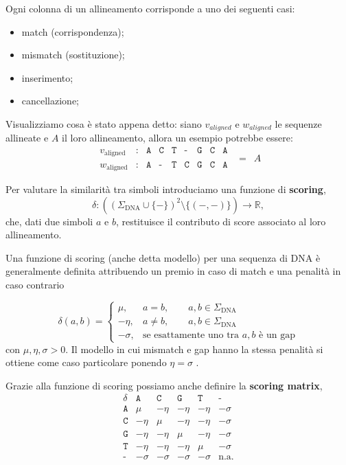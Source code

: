 Ogni colonna di un allineamento corrisponde a uno dei seguenti casi:
\begin{itemize}
    \item match (corrispondenza);
    \item mismatch (sostituzione);
    \item inserimento;
    \item cancellazione;
\end{itemize}

Visualizziamo cosa è stato appena detto: siano $v_{aligned}$ e $w_{aligned}$ le sequenze allineate e $A$ il loro allineamento,
allora un esempio potrebbe essere:
\[
    \begin{matrix}
        v_{\text{aligned}} & : & \texttt{A} & \texttt{C} & \texttt{T} & \texttt{-} & \texttt{G} & \texttt{C} & \texttt{A} \\
        w_{\text{aligned}} & : & \texttt{A} & \texttt{-} & \texttt{T} & \texttt{C} & \texttt{G} & \texttt{C} & \texttt{A} 
    \end{matrix}\enspace = \enspace A
\]

Per valutare la similarità tra simboli introduciamo una funzione di \textbf{scoring},
\[
    \delta : ((\Sigma_{\text{DNA}}\cup \{ - \})^{2}\setminus \{ (-,-) \}) \to \mathbb{R},
\]
che, dati due simboli $a$ e $b$, restituisce il contributo di score associato al loro allineamento.

Una funzione di scoring (anche detta modello) per una sequenza di DNA è generalmente definita attribuendo un premio in caso di match e una penalità in caso contrario

\[
    \delta(a,b)=
    \begin{cases}
        \mu, & a=b, \qquad a,b \in \Sigma_{\text{DNA}} \\
        -\eta, & a\neq b, \qquad a,b \in \Sigma_{\text{DNA}}\\
        -\sigma, & \text{se esattamente uno tra }a, b \text{ è un gap}
    \end{cases}
\]
con $\mu,\eta,\sigma > 0$.
Il modello in cui mismatch e gap hanno la stessa penalità si ottiene come caso particolare ponendo $\eta = \sigma$
\cite[pp.~177--180]{jones--pevzner}.

Grazie alla funzione di scoring possiamo anche definire la \textbf{scoring matrix}, 
\[
    \begin{array}{c|ccccc}
    \delta & \texttt{A} & \texttt{C} & \texttt{G} & \texttt{T} & \texttt{-}\\
    \hline
    \texttt{A} & \mu & -\eta & -\eta & -\eta & -\sigma\\
    \texttt{C} & -\eta & \mu & -\eta & -\eta & -\sigma\\
    \texttt{G} & -\eta & -\eta & \mu & -\eta & -\sigma\\
    \texttt{T} & -\eta & -\eta & -\eta & \mu & -\sigma\\
    \texttt{-} & -\sigma & -\sigma & -\sigma & -\sigma & \text{n.a.}
    \end{array}
\]

